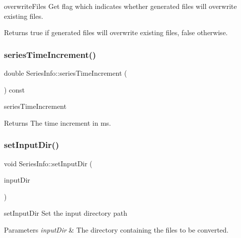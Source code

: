 overwrite\+Files Get flag which indicates whether generated files will overwrite existing files. 

\begin{DoxyReturn}{Returns}
true if generated files will overwrite existing files, false otherwise. 
\end{DoxyReturn}
\mbox{\label{class_series_info_aa3cd8fea1ca4d619817e07be017fb7d6}} 
\subsubsection{\texorpdfstring{series\+Time\+Increment()}{seriesTimeIncrement()}}
{\footnotesize\ttfamily double Series\+Info\+::series\+Time\+Increment (\begin{DoxyParamCaption}{ }\end{DoxyParamCaption}) const\hspace{0.3cm}{\ttfamily [inline]}}



series\+Time\+Increment 

\begin{DoxyReturn}{Returns}
The time increment in ms. 
\end{DoxyReturn}
\mbox{\label{class_series_info_a19ce250d3f423a513a6492b9bd5aa908}} 
\subsubsection{\texorpdfstring{set\+Input\+Dir()}{setInputDir()}}
{\footnotesize\ttfamily void Series\+Info\+::set\+Input\+Dir (\begin{DoxyParamCaption}\item[{const Q\+Dir \&}]{input\+Dir }\end{DoxyParamCaption})\hspace{0.3cm}{\ttfamily [inline]}}



set\+Input\+Dir Set the input directory path 


\begin{DoxyParams}{Parameters}
{\em input\+Dir} & The directory containing the files to be converted. \\
\hline
\end{DoxyParams}
\mbox{\label{class_series_info_a09ff36a5e9ad4ec4cd2030a8e5abefa2}} 

